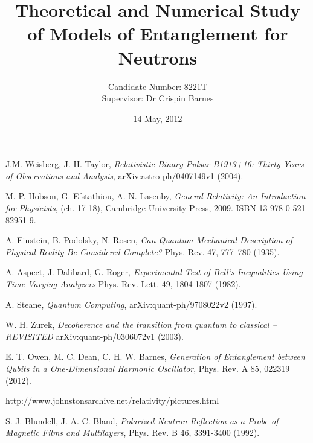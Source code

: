 \documentclass[12pt]{article}
\title{Theoretical and Numerical Study of Models of Entanglement for
  Neutrons}
\date{14 May, 2012}
\author{ Candidate Number: 8221T \\ Supervisor: Dr Crispin Barnes }
\begin{document}
 

\maketitle













\newpage





\begin{thebibliography}{9}

 J.M. Weisberg, J. H. Taylor, \emph{Relativistic
  Binary Pulsar B1913+16: Thirty Years of Observations and Analysis},
  arXiv:astro-ph/0407149v1 (2004).

 M. P. Hobson, G. Efstathiou, A. N. Lasenby,
  \emph{General Relativity: An Introduction for Physicists},
  (ch. 17-18), Cambridge University Press, 2009.  ISBN-13
  978-0-521-82951-9.

  A. Einstein, B. Podolsky, N. Rosen, 
  \emph{Can Quantum-Mechanical Description of Physical Reality Be Considered Complete?}
  Phys. Rev. 47, 777–780
  (1935).

 A. Aspect, J. Dalibard, G. Roger, \emph{Experimental
  Test of Bell's Inequalities Using Time-Varying Analyzers}
  Phys. Rev. Lett. 49, 1804-1807 (1982).

 A. Steane, \emph{Quantum Computing},
  arXiv:quant-ph/9708022v2 (1997).

 W. H. Zurek, \emph{Decoherence and the transition from
  quantum to classical -- REVISITED} arXiv:quant-ph/0306072v1 (2003).

 E. T. Owen, M. C. Dean, C. H. W. Barnes,
  \emph{Generation of Entanglement between Qubits in a One-Dimensional
    Harmonic Oscillator}, Phys. Rev. A 85, 022319 (2012).

  http://www.johnstonsarchive.net/relativity/pictures.html

 S. J. Blundell, J. A. C. Bland, \emph{Polarized
  Neutron Reflection as a Probe of Magnetic Films and Multilayers},
  Phys. Rev. B 46, 3391-3400 (1992).


\end{thebibliography}
\end{document}
